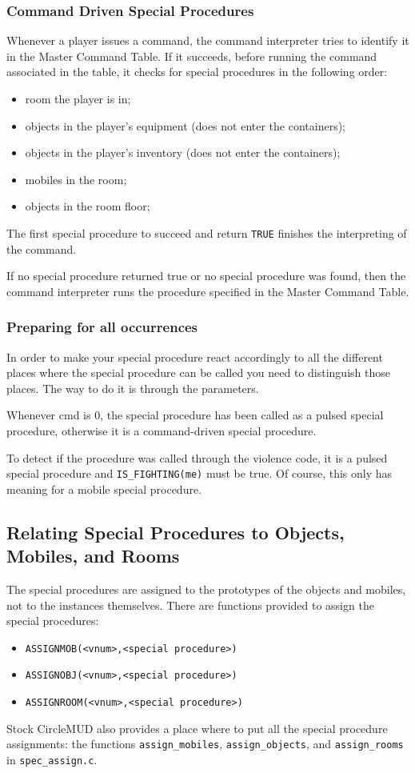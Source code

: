 \documentclass[11pt]{article}
\begin{document}
\subsubsection{Command Driven Special Procedures}
Whenever a player issues a command, the command interpreter tries to identify it in the Master Command Table. If it succeeds, before running the command associated in the table, it checks for special procedures in the following order:
\begin{itemize}
\item room the player is in;
\item objects in the player's equipment (does not enter the containers);
\item objects in the player's inventory (does not enter the containers);
\item mobiles in the room;
\item objects in the room floor;
\end{itemize}
The first special procedure to succeed and return \texttt{TRUE} finishes the interpreting of the command.
\par
If no special procedure returned true or no special procedure was found, then the command interpreter runs the procedure specified in the Master Command Table.

\subsubsection{Preparing for all occurrences}
In order to make your special procedure react accordingly to all the different places where the special procedure can be called you need to distinguish those places. The way to do it is through the parameters.
\par
Whenever cmd is 0, the special procedure has been called as a pulsed special procedure, otherwise it is a command-driven special procedure.
\par
To detect if the procedure was called through the violence code, it is a pulsed special procedure and \texttt{IS\_FIGHTING(me)} must be true. Of course, this only has meaning for a mobile special procedure.

\subsection{Relating Special Procedures to Objects, Mobiles, and Rooms}
The special procedures are assigned to the prototypes of the objects and mobiles, not to the instances themselves. There are functions provided to assign the special procedures:
\begin{itemize}
\item \texttt{ASSIGNMOB(<vnum>,<special procedure>)}
\item \texttt{ASSIGNOBJ(<vnum>,<special procedure>)}
\item \texttt{ASSIGNROOM(<vnum>,<special procedure>)}
\end{itemize}
Stock CircleMUD also provides a place where to put all the special procedure assignments: the functions \texttt{assign\_mobiles}, \texttt{assign\_objects}, and \texttt{assign\_rooms} in \texttt{spec\_assign.c}.
\end{document}
